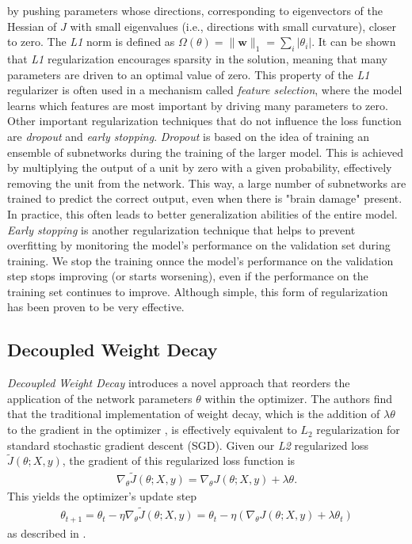 by pushing parameters whose directions, corresponding to eigenvectors of the Hessian of $J$ with small
eigenvalues (i.e., directions with small curvature), closer to zero.
The \emph{L1} norm is defined as  \(\Omega(\theta) = \|\mathbf{w}\|_1 = \sum_i |\theta_i|\).
It can be shown that \emph{L1} regularization encourages sparsity in the solution, meaning that many parameters are driven to an optimal value of zero.
This property of the \emph{L1} regularizer is often used in a mechanism called \emph{feature selection},
where the model learns which features are most important by driving many parameters to zero. 
Other important regularization techniques that do not influence the loss function are \emph{dropout}
and \emph{early stopping}. \emph{Dropout} is based on the idea of training an ensemble of subnetworks
during the training of the larger model. This is achieved by multiplying the output of a unit 
by zero with a given probability, effectively removing the unit from the network.
This way, a large number of subnetworks are trained to predict the correct output, even when there
is "brain damage" present. In practice, this often leads to better generalization abilities of the
entire model. \emph{Early stopping} is another regularization technique that helps to prevent overfitting
by monitoring the model's performance on the validation set during training. We stop the training onnce
the model's performance on the validation step stops improving (or starts worsening), even if the performance
on the training set continues to improve. Although simple, this form of regularization has been proven to be very effective.
\cite{Goodfellow-et-al-2016}

\subsection{Decoupled Weight Decay \cite{Loshchilov2017FixingWD}}
\label{sec:dcp_weightdecay}

\emph{Decoupled Weight Decay}  introduces a novel approach that reorders the application of the network parameters $\theta$ within the optimizer.
The authors find that the traditional implementation of weight decay, which is the addition of $\lambda \theta$ to the gradient in the optimizer \cite{Loshchilov2017FixingWD},
is effectively equivalent to $L_2$ regularization
for standard stochastic gradient descent (SGD). Given our \emph{L2} regularized loss $\tilde{J}(\theta; X, y)$,
the gradient of this regularized loss function is
\begin{align}
\nabla_{\theta} \tilde{J}(\theta; X, y) = \nabla_{\theta} J(\theta; X, y) + \lambda \theta.
\end{align}
This yields the optimizer's update step
\begin{align}
\theta_{t+1} = \theta_t - \eta \nabla_{\theta} \tilde{J}(\theta; X, y) = \theta_t - \eta (\nabla_{\theta} J(\theta; X, y) + \lambda \theta_t)
\end{align}
\noindent as described in \cite{DecoupledWeightDecay}.

